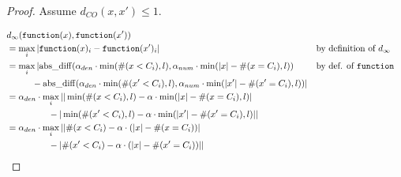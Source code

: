 \documentclass{article}
\begin{document}
\begin{proof}
    Assume $d_{CO}(x, x') \le 1$. 

    \begin{align*}
        &d_\infty(\texttt{function}(x), \texttt{function}(x')) \\
        &= \max\limits_{i} |\texttt{function}(x)_i - \texttt{function}(x')_i| &&\text{by definition of } d_\infty \\
        &= \max\limits_{i} |\mathrm{abs\_diff}(\alpha_{den} \cdot \min(\#(x < C_i), l), \alpha_{num} \cdot \min(|x| - \#(x = C_i), l)) &&\text{by def. of } \texttt{function}
            \\&\hspace{1cm} -\mathrm{abs\_diff}(\alpha_{den} \cdot \min(\#(x' < C_i), l), \alpha_{num} \cdot \min(|x'| - \#(x' = C_i), l))| \\
        &= \alpha_{den} \cdot \max\limits_{i} ||\min(\#(x < C_i), l) - \alpha \cdot \min(|x| - \#(x = C_i), l)|
            \\&\hspace{1.65cm}-|\min(\#(x' < C_i), l) - \alpha \cdot \min(|x'| - \#(x' = C_i), l)|| \\
        &= \alpha_{den} \cdot \max\limits_{i} ||\#(x < C_i) - \alpha \cdot (|x| - \#(x = C_i))|
            \\&\hspace{1.65cm}-|\#(x' < C_i) - \alpha \cdot (|x| - \#(x' = C_i))|| \\
    \end{align*}


\end{proof}
\end{document}

